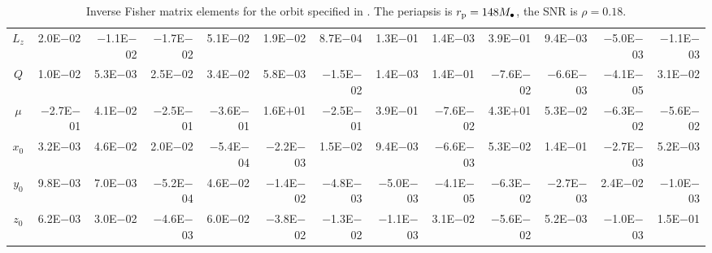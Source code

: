 \begin{sidewaystable}[htbp]
\begin{tabular}{crrrrrrrrrrrr}
$L_z$ & 2.0E$-$02 & $-$1.1E$-$02 & $-$1.7E$-$02 & 5.1E$-$02 & 1.9E$-$02 & 8.7E$-$04 & 1.3E$-$01 & 1.4E$-$03 & 3.9E$-$01 & 9.4E$-$03 & $-$5.0E$-$03 & $-$1.1E$-$03 \\
$Q$ & 1.0E$-$02 & 5.3E$-$03 & 2.5E$-$02 & 3.4E$-$02 & 5.8E$-$03 & $-$1.5E$-$02 & 1.4E$-$03 & 1.4E$-$01 & $-$7.6E$-$02 & $-$6.6E$-$03 & $-$4.1E$-$05 & 3.1E$-$02 \\
$\mu$ & $-$2.7E$-$01 & 4.1E$-$02 & $-$2.5E$-$01 & $-$3.6E$-$01 & 1.6E$+$01 & $-$2.5E$-$01 & 3.9E$-$01 & $-$7.6E$-$02 & 4.3E$+$01 & 5.3E$-$02 & $-$6.3E$-$02 & $-$5.6E$-$02 \\
$x_0$ & 3.2E$-$03 & 4.6E$-$02 & 2.0E$-$02 & $-$5.4E$-$04 & $-$2.2E$-$03 & 1.5E$-$02 & 9.4E$-$03 & $-$6.6E$-$03 & 5.3E$-$02 & 1.4E$-$01 & $-$2.7E$-$03 & 5.2E$-$03 \\
$y_0$ & 9.8E$-$03 & 7.0E$-$03 & $-$5.2E$-$04 & 4.6E$-$02 & $-$1.4E$-$02 & $-$4.8E$-$03 & $-$5.0E$-$03 & $-$4.1E$-$05 & $-$6.3E$-$02 & $-$2.7E$-$03 & 2.4E$-$02 & $-$1.0E$-$03 \\
$z_0$ & 6.2E$-$03 & 3.0E$-$02 & $-$4.6E$-$03 & 6.0E$-$02 & $-$3.8E$-$02 & $-$1.3E$-$02 & $-$1.1E$-$03 & 3.1E$-$02 & $-$5.6E$-$02 & 5.2E$-$03 & $-$1.0E$-$03 & 1.5E$-$01 \\
\bottomrule
\end{tabular}
\caption{Inverse Fisher matrix elements for the orbit specified in . The periapsis is $r_\mathrm{p} = 148 M_\bullet$, the SNR is $\rho = 0.18$.}
\label{tab:Fisher_7}
\end{sidewaystable}
